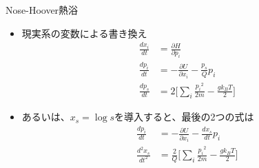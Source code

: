 
\begin{frame}[t,fragile]{Nose-Hoover熱浴}
  \begin{itemize}
  \item 現実系の変数による書き換え
    \begin{align*}
      \frac{dx_i}{dt} &= \frac{\partial H}{\partial p_i} \\
      \frac{dp_i}{dt} &= -\frac{\partial U}{\partial x_i} -\frac{p_s}{Q} p_i \\
      \frac{dp_s}{dt} &= 2 \big[ \sum_i \frac{{p_i}^2}{2m} - \frac{g k_B T}{2} \big]
    \end{align*}
  \item あるいは、$x_s = \log s$を導入すると、最後の2つの式は
    \begin{align*}
      \frac{dp_i}{dt} &= -\frac{\partial U}{\partial x_i} -\frac{dx_s}{dt} p_i \\
      \frac{d^2x_s}{dt^2} &= \frac{2}{Q} \big[ \sum_i \frac{{p_i}^2}{2m} - \frac{g k_B T}{2} \big]
    \end{align*}
  \end{itemize}
\end{frame}
